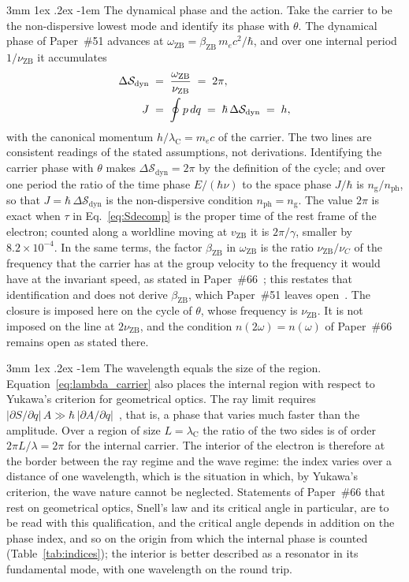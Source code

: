 \documentclass[%
 reprint, amsmath,amssymb, aps, prb, ]{revtex4-2}
\makeatletter
\numberwithin{equation}{section}
\renewcommand\paragraph{%
  \@startsection{paragraph}{4}{\z@}%
    {3mm \@plus 1ex \@minus .2ex}%
    {-1em}%
    {\normalfont\normalsize\itshape}}
\newcommand{\iphase}{\theta}  %
\newcommand{\omZB}{\omega_{\text{ZB}}}
\newcommand{\lambdaC}{\lambda_{\mathrm{C}}}
\newcommand{\bZB}{\beta_{\mathrm{ZB}}}
\newcommand{\Sdyn}{\mathcal{S}_{\mathrm{dyn}}}
\newcommand{\nph}{n_{\mathrm{ph}}}
\newcommand{\ngr}{n_{\mathrm{g}}}
\makeatother
\begin{document}
\paragraph{The dynamical phase and the action.} Take the carrier to be the non-dispersive lowest mode and identify its phase with $\iphase$. The dynamical phase of Paper~\#51 advances at $\omZB = \bZB\,m_ec^2/\hbar$, and over one internal period $1/\nu_{\mathrm{ZB}}$ it accumulates
\begin{align}
\Delta\Sdyn &\;=\; \frac{\omZB}{\nu_{\mathrm{ZB}}} \;=\; 2\pi,
\notag\\
J &\;=\; \oint p\,dq \;=\; \hbar\,\Delta\Sdyn \;=\; h,
\label{eq:Jh}
\end{align}
with the canonical momentum $h/\lambdaC = m_ec$ of the carrier. The two lines are consistent readings of the stated assumptions, not derivations. Identifying the carrier phase with $\iphase$ makes $\Delta\Sdyn = 2\pi$ by the definition of the cycle; and over one period the ratio of the time phase $E/(\hbar\nu)$ to the space phase $J/\hbar$ is $\ngr/\nph$, so that $J = \hbar\,\Delta\Sdyn$ is the non-dispersive condition $\nph = \ngr$. The value $2\pi$ is exact when $\tau$ in Eq.~\eqref{eq:Sdecomp} is the proper time of the rest frame of the electron; counted along a worldline moving at $v_{\mathrm{ZB}}$ it is $2\pi/\gamma$, smaller by $8.2\times10^{-4}$. In the same terms, the factor $\bZB$ in $\omZB$ is the ratio $\nu_{\mathrm{ZB}}/\nu_C$ of the frequency that the carrier has at the group velocity to the frequency it would have at the invariant speed, as stated in Paper~\#66~\cite{H66}; this restates that identification and does not derive $\bZB$, which Paper~\#51 leaves open~\cite{H51}. The closure is imposed here on the cycle of $\iphase$, whose frequency is $\nu_{\mathrm{ZB}}$. It is not imposed on the line at $2\nu_{\mathrm{ZB}}$, and the condition $n(2\omega) = n(\omega)$ of Paper~\#66 remains open as stated there.

\paragraph{The wavelength equals the size of the region.} Equation~\eqref{eq:lambda_carrier} also places the internal region with respect to Yukawa's criterion for geometrical optics. The ray limit requires $|\partial S/\partial q|\,A \gg \hbar\,|\partial A/\partial q|$~\cite{Yukawa1954}, that is, a phase that varies much faster than the amplitude. Over a region of size $L = \lambdaC$ the ratio of the two sides is of order $2\pi L/\lambda = 2\pi$ for the internal carrier. The interior of the electron is therefore at the border between the ray regime and the wave regime: the index varies over a distance of one wavelength, which is the situation in which, by Yukawa's criterion, the wave nature cannot be neglected. Statements of Paper~\#66 that rest on geometrical optics, Snell's law and its critical angle in particular, are to be read with this qualification, and the critical angle depends in addition on the phase index, and so on the origin from which the internal phase is counted (Table~\ref{tab:indices}); the interior is better described as a resonator in its fundamental mode, with one wavelength on the round trip.
\end{document}
